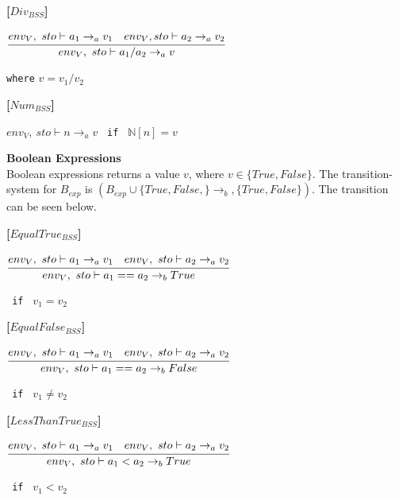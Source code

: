 \textbf{[$Div_{BSS}$]}\\
\begin{center}
	\begin{math}
	\cfrac
	{env_V,\ sto \vdash a_1 \rightarrow_a v_1 \quad env_V, sto \vdash a_2 \rightarrow_a v_2}
	{env_V,\ sto \vdash a_1 / a_2 \rightarrow_a v}
	\end{math}
	
	
	\texttt{where} $v = v_1 / v_2$
\end{center}

\textbf{[$Num_{BSS}$]}\\
\begin{center}
	\begin{math}
		env_V,\ sto \vdash n \rightarrow_a v
	\end{math}
	\texttt{ if } $\mathbb{N}[n] = v$
\end{center}

\textbf{\large{Boolean Expressions}}\\
Boolean expressions returns a value $v$, where $v \in \{True, False\}$.
The transition-system for $B_{exp}$ is $(B_{exp} \cup \{True, False,\} \rightarrow_b, \{True, False\})$.
The transition can be seen below.

\textbf{[$EqualTrue_{BSS}$]}\\
\begin{center}
	\begin{math}
		\cfrac
			{env_V,\ sto \vdash a_1 \rightarrow_a v_1 \quad env_V,\ sto \vdash a_2 \rightarrow_a v_2}
			{env_V,\ sto \vdash a_1 == a_2 \rightarrow_b True}
	\end{math}
	
	\texttt{ if } $v_1 = v_2$
\end{center}

\textbf{[$EqualFalse_{BSS}$]}\\
\begin{center}
	\begin{math}
	\cfrac
	{env_V,\ sto \vdash a_1 \rightarrow_a v_1 \quad env_V,\ sto \vdash a_2 \rightarrow_a v_2}
	{env_V,\ sto \vdash a_1 == a_2 \rightarrow_b False}
	\end{math}
	
	\texttt{ if } $v_1 \neq v_2$
\end{center}

\textbf{[$LessThanTrue_{BSS}$]}\\
\begin{center}
	\begin{math}
	\cfrac
	{env_V,\ sto \vdash a_1 \rightarrow_a v_1 \quad env_V,\ sto \vdash a_2 \rightarrow_a v_2}
	{env_V,\ sto \vdash a_1 < a_2 \rightarrow_b True}
	\end{math}
	
	\texttt{ if } $v_1 < v_2$
\end{center}

